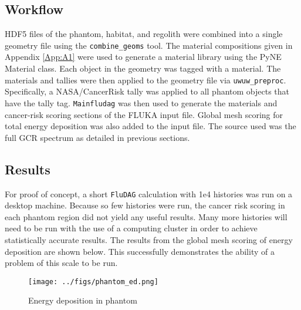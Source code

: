 \subsection*{Workflow}
HDF5 files of the phantom, habitat, and regolith were combined into a single geometry file
using the \texttt{combine\_geoms} tool.  The material compositions given in Appendix \ref{App:A1}
were used to generate a material library using the PyNE Material class.  Each object in
the geometry was tagged with a material.  The materials and tallies were then applied to the
geometry file via \texttt{uwuw\_preproc}.  Specifically, a NASA/CancerRisk tally was applied 
to all phantom objects that have the tally tag. \texttt{Mainfludag} was then used to generate the 
materials and cancer-risk scoring sections of the FLUKA input file.  Global mesh scoring 
for total energy deposition was also added to the input file.  The source used was the 
full GCR spectrum as detailed in previous sections.  


\subsection*{Results}

For proof of concept, a short \texttt{FluDAG}
calculation with 1e4 histories was run on a desktop machine.  Because so few histories 
were run, the cancer risk scoring in each phantom region did not yield any useful results.  
Many more histories will need to be run with the use of a computing cluster in order to 
achieve statistically accurate results.  The results from the global mesh scoring of 
energy deposition are shown below.  This successfully demonstrates the ability of a problem
of this scale to be run. 
 

\begin{figure} [h!]
 \begin{centering}
 \centering
 \texttt{[image: ../figs/phantom\_ed.png]}
 \caption{Energy deposition in phantom}
 \end{centering}
\end{figure}
